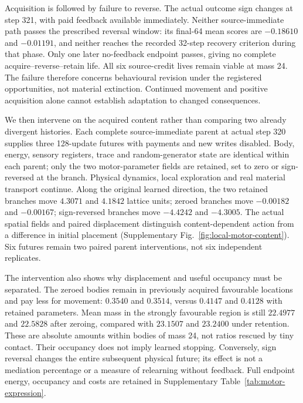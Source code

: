 Acquisition is followed by failure to reverse. The actual outcome sign changes at step 321, with paid feedback available immediately. Neither source-immediate path passes the prescribed reversal window: its final-64 mean scores are $-0.18610$ and $-0.01191$, and neither reaches the recorded 32-step recovery criterion during that phase. Only one later no-feedback endpoint passes, giving no complete acquire--reverse--retain life. All six source-credit lives remain viable at mass 24. The failure therefore concerns behavioural revision under the registered opportunities, not material extinction. Continued movement and positive acquisition alone cannot establish adaptation to changed consequences.

We then intervene on the acquired content rather than comparing two already divergent histories. Each complete source-immediate parent at actual step 320 supplies three 128-update futures with payments and new writes disabled. Body, energy, sensory registers, trace and random-generator state are identical within each parent; only the two motor-parameter fields are retained, set to zero or sign-reversed at the branch. Physical dynamics, local exploration and real material transport continue. Along the original learned direction, the two retained branches move $4.3071$ and $4.1842$ lattice units; zeroed branches move $-0.00182$ and $-0.00167$; sign-reversed branches move $-4.4242$ and $-4.3005$. The actual spatial fields and paired displacement distinguish content-dependent action from a difference in initial placement (Supplementary Fig.~\ref{fig:local-motor-content}). Six futures remain two paired parent interventions, not six independent replicates.

The intervention also shows why displacement and useful occupancy must be separated. The zeroed bodies remain in previously acquired favourable locations and pay less for movement: $0.3540$ and $0.3514$, versus $0.4147$ and $0.4128$ with retained parameters. Mean mass in the strongly favourable region is still $22.4977$ and $22.5828$ after zeroing, compared with $23.1507$ and $23.2400$ under retention. These are absolute amounts within bodies of mass 24, not ratios rescued by tiny contact. Their occupancy does not imply learned stopping. Conversely, sign reversal changes the entire subsequent physical future; its effect is not a mediation percentage or a measure of relearning without feedback. Full endpoint energy, occupancy and costs are retained in Supplementary Table~\ref{tab:motor-expression}.

